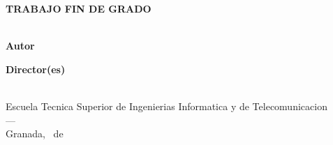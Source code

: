 
\thispagestyle{empty}

\begin{titlepage}
\centering
\vspace*{1.5cm}

{\Large \textbf{TRABAJO FIN DE GRADO}}\\[0.3cm]
{\large \textbf{\MakeUppercase{\tfgtitulacion}}}\\[2.5cm]

{\huge \bfseries \tfgtitulo \par}
\vspace{0.6cm}
{\large \itshape \tfgsubtitulo \par}
\vspace{3cm}

\begin{minipage}{0.45\textwidth}
  \begin{flushleft}
    \textbf{Autor}\\
    \tfgautor
  \end{flushleft}
\end{minipage}
\hfill
\begin{minipage}{0.45\textwidth}
  \begin{flushright}
    \textbf{Director(es)}\\
    \tfgtutorA
    \ifx\tfgtutorB\empty\else\\\tfgtutorB\fi
  \end{flushright}
\end{minipage}

\vfill

{\large Escuela Tecnica Superior de Ingenierias Informatica y de Telecomunicacion}\\[0.2cm]
{\large ---}\\[0.2cm]
{\large Granada, \tfgmes\ de \tfganio}

\end{titlepage}

\cleardoublepage
